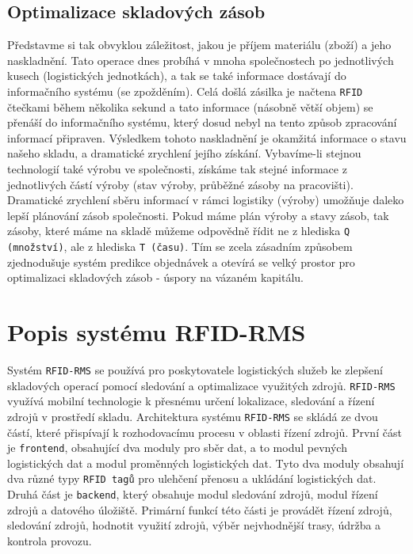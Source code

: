 \documentclass[czech,BP]{thesiskiv}
\begin{document}
\subsection{Optimalizace skladových zásob}
Představme si tak obvyklou záležitost, jakou je příjem materiálu (zboží) a jeho naskladnění. Tato operace dnes probíhá v mnoha společnostech po jednotlivých kusech (logistických jednotkách), a tak se také informace dostávají do informačního systému (se zpožděním).
Celá došlá zásilka je načtena \texttt{RFID} čtečkami během několika sekund a tato informace (násobně větší objem) se přenáší do informačního systému, který dosud nebyl na tento způsob zpracování informací připraven. Výsledkem tohoto naskladnění je okamžitá informace o stavu našeho skladu, a dramatické zrychlení jejího získání. Vybavíme-li stejnou technologií také výrobu ve společnosti, získáme tak stejné informace z jednotlivých částí výroby (stav výroby, průběžné zásoby na pracovišti). 
Dramatické zrychlení sběru informací v rámci logistiky (výroby) umožňuje daleko lepší plánování zásob společnosti. Pokud máme plán výroby a stavy zásob, tak zásoby, které máme na skladě můžeme odpovědně řídit ne z hlediska \texttt{Q (množství)}, ale z hlediska 
\texttt{T (času)}. Tím se zcela zásadním způsobem zjednodušuje systém predikce objednávek a otevírá se velký prostor pro optimalizaci skladových zásob - úspory na vázaném kapitálu.\cite{dolevcek2010identifikace}



\section{Popis systému RFID-RMS}

Systém \texttt{RFID-RMS} se používá pro poskytovatele logistických služeb ke zlepšení skladových operací pomocí sledování a optimalizace využitých zdrojů. \texttt{RFID-RMS} využívá mobilní technologie k přesnému určení lokalizace, sledování a řízení zdrojů v prostředí skladu. Architektura systému \texttt{RFID-RMS} se skládá ze dvou částí, které přispívají k rozhodovacímu procesu v oblasti řízení zdrojů. První část je \texttt{frontend}, obsahující dva moduly pro sběr dat, a to modul pevných logistických dat a modul proměnných logistických dat. Tyto dva moduly obsahují dva různé typy \texttt{RFID tagů} pro ulehčení přenosu a ukládání logistických dat. Druhá část je \texttt{backend}, který obsahuje modul sledování zdrojů, modul řízení zdrojů a datového úložiště. Primární funkcí této části je provádět řízení zdrojů, sledování zdrojů, hodnotit využití zdrojů, výběr nejvhodnější trasy, údržba a kontrola provozu.\cite{chow2006design}
\end{document}
